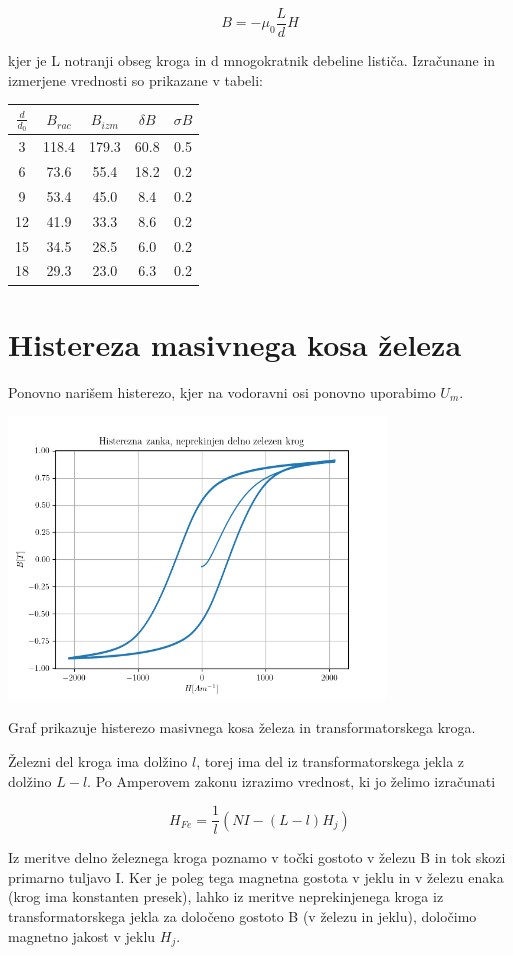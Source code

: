 \documentclass[12pt]{report}
\begin{document}
\begin{equation}
  B = -\mu_0 \frac{L}{d}H
\end{equation}

kjer je L notranji obseg kroga in d mnogokratnik debeline lističa. Izračunane in izmerjene vrednosti so prikazane v tabeli: 

\begin{tabela}[H]
  \centering
  \begin{tabular}{|c|c c|c c|} \hline
    $\frac{d}{d_0}$ & $B_{rac}$ & $B_{izm}$ & $\delta B$ & $\sigma B$ \\ \hline
    3 & 118.4 & 179.3 & 60.8 & 0.5 \\ \hline
    6 & 73.6 & 55.4 & 18.2 & 0.2 \\ \hline
    9 & 53.4 & 45.0 & 8.4 & 0.2 \\ \hline
    12 & 41.9 & 33.3 & 8.6 & 0.2 \\ \hline
    15 & 34.5 & 28.5 & 6.0 & 0.2 \\ \hline
    18 & 29.3 & 23.0 & 6.3 & 0.2 \\ \hline
  \end{tabular}
\end{tabela}

\section*{Histereza masivnega kosa železa}

Ponovno narišem histerezo, kjer na vodoravni osi ponovno uporabimo $U_m$. 

\begin{slika}[H]
  \centering
  \includegraphics[width=0.75\textwidth]{zelezo}
  \caption{\small Graf prikazuje histerezo masivnega kosa železa in transformatorskega kroga.}
\end{slika}

Železni del kroga ima dolžino $l$, torej ima del iz transformatorskega jekla z dolžino $L-l$. Po Amperovem zakonu izrazimo vrednost, ki jo želimo izračunati

\begin{equation}
  H_{Fe} = \frac{1}{l} \left(NI - (L - l)H_j\right)
\end{equation}

Iz meritve delno železnega kroga poznamo v točki gostoto v železu B in tok skozi primarno tuljavo I. Ker je poleg tega magnetna gostota v jeklu in v železu enaka (krog ima konstanten presek), lahko iz meritve neprekinjenega kroga iz transformatorskega jekla za določeno gostoto B (v železu in jeklu), določimo magnetno jakost v jeklu $H_j$. 
\end{document}
